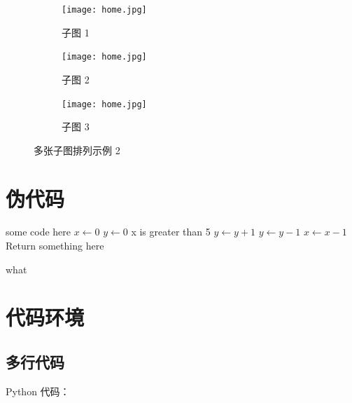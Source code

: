 \documentclass[fontset=none]{ctexart}
\begin{document}
\begin{figure}[!htbp]
    \begin{subfigure}[b]{\textwidth}
        \texttt{[image: home.jpg]}
        \caption{子图 1}
    \end{subfigure}

    \begin{subfigure}[b]{0.48\textwidth}
        \texttt{[image: home.jpg]}
        \caption{子图 2}
    \end{subfigure}
    \hfill
    \begin{subfigure}[b]{0.48\textwidth}
        \texttt{[image: home.jpg]}
        \caption{子图 3}
    \end{subfigure}

    \centering
    \caption{多张子图排列示例 2}
\end{figure}

\section{伪代码}

\begin{algorithm}[H]
    \SetAlgoLined
    \SetNoFillComment
    \vspace{3mm}
    some code here\;
    $x \leftarrow 0$\;
    $y \leftarrow 0$\;
     {
        x is greater than 5 
    }
     {
        $y \leftarrow y + 1$\;
    }
     {
        $y \leftarrow y - 1$\;
    }
     {
        $x \leftarrow x - 1$\;
    }
    \Return Return something here\;
    \caption{what}
\end{algorithm}

\section{代码环境}

\subsection{多行代码}

Python 代码：
\end{document}
